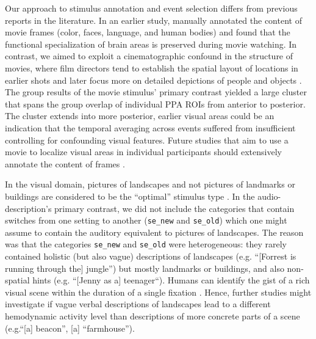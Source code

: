 \documentclass[english]{article}
\begin{document}
Our approach to stimulus annotation and event selection differs from previous
reports in the literature.
In an earlier study, \cite{bartels2004mapping} manually annotated the content of
movie frames (color, faces, language, and human bodies) and found that the
functional specialization of brain areas is preserved during movie watching.
%
In contrast, we aimed to exploit a cinematographic confound in the structure of
movies, where
film directors tend to establish the spatial layout of locations in earlier
shots and later focus more on detailed depictions of people and objects
\citep{brown2012cinematography, katz1991film, mascelli1998five}.
The group results of the movie stimulus' primary contrast yielded a large
cluster that spans the group overlap of individual PPA ROIs from anterior to
posterior.
The cluster extends into more posterior, earlier visual areas could be an
indication that the temporal averaging across events suffered from insufficient
controlling for confounding visual features.
Future studies that aim to use a movie to localize visual areas in individual
participants should extensively annotate the content of frames \citep[e.g.,
using the open-source solution ``Pliers'' for feature extraction from a visual
naturalistic stimulus;][]{mcnamara2017developing}.

In the visual domain, pictures of landscapes and not pictures of landmarks or
buildings are considered to be the ``optimal'' stimulus type
\citep{epstein2008parahippocampal}.
In the audio-description's primary contrast, we did not include the categories
that contain switches from one setting to another (\texttt{se\_new} and
\texttt{se\_old}) which one might assume to contain the auditory equivalent to
pictures of landscapes.
The reason was that the categories \texttt{se\_new} and \texttt{se\_old} were
heterogeneous: they rarely contained holistic (but also vague) descriptions of
landscapes (e.g.  ``[Forrest is running through the] jungle'') but mostly
landmarks or buildings, and also non-spatial hints (e.g. ``[Jenny as a]
teenager``).
Humans can identify the gist of a rich visual scene within the duration of a
single fixation \citep{henderson2003human}.
%
Hence, further studies might investigate if vague verbal descriptions of
landscapes lead to a different hemodynamic activity level than descriptions of
more concrete parts of a scene (e.g.``[a] beacon'', [a] ``farmhouse'').
\end{document}
